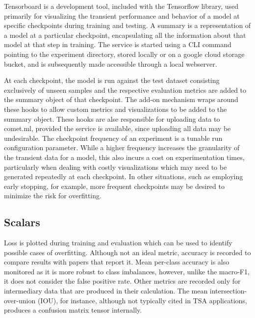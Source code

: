 \documentclass[../../fyp.tex]{subfiles}
\begin{document}
Tensorboard is a development tool, included with the Tensorflow library, used primarily for visualizing the transient performance and behavior of a model at specific checkpoints during training and testing. A summary is a representation of a model at a particular checkpoint, encapsulating all the information about that model at that step in training. The service is started using a CLI command pointing to the experiment directory, stored locally or on a google cloud storage bucket, and is subsequently made accessible through a local webserver.   

At each checkpoint, the model is run against the test dataset consisting exclusively of unseen samples and the respective evaluation metrics are added to the summary object of that checkpoint. The add-on mechanism wraps around these hooks to allow custom metrics and visualizations to be added to the summary object. These hooks are alse responsible for uploading data to comet.ml, provided the service is available, since uploading all data may be undesirable. The checkpoint frequency of an experiment is a tunable run configuration parameter. While a higher frequency increases the granularity of the transient data for a model, this also incurs a cost on experimentation times, particularly when dealing with costly visualizations which may need to be generated repeatedly at each checkpoint. In other situations, such as employing early stopping, for example, more frequent checkpoints may be desired to minimize the risk for overfitting.

\subsection{Scalars}
Loss is plotted during training and evaluation which can be used to identify possible cases of overfitting. Although not an ideal metric, accuracy is recorded to compare results with papers that report it. Mean per-class accuracy is also monitored as it is more robust to class imbalances, however, unlike the macro-F1, it does not consider the false positive rate. Other metrics are recorded only for intermediary data that are produced in their calculation. The mean intersection-over-union (IOU), for instance, although not typically cited in TSA applications, produces a confusion matrix tensor internally.
\end{document}
